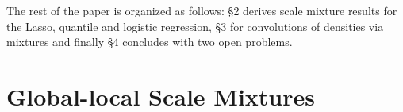 \documentclass[lineno]{biometrika}
\begin{document}
%
%

The rest of the paper is organized as follows: \S 2 derives scale mixture results for the Lasso, quantile and logistic regression, \S 3 for convolutions of densities via mixtures and finally \S 4 concludes with two open problems. 

\section{Global-local Scale Mixtures}
\end{document}
